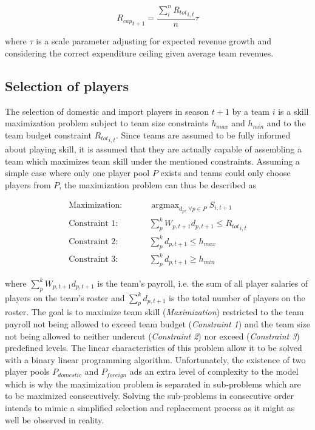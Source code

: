\documentclass[12pt, a4paper]{article}
\DeclareMathOperator*{\argmax}{argmax} %
\begin{document}
\begin{equation} 
{R_{cap}}_{t+1} = \frac{\sum_{i}^{n}{R_{tot}}_{i,t}}{n}\tau
\end{equation}

\noindent
where $\tau$ is a scale parameter adjusting for expected revenue growth and considering the correct expenditure ceiling given average team revenues. 

\subsection{Selection of players}
\label{selectionOfPlayers}
The selection of domestic and import players in season $t+1$ by a team $i$ is a skill maximization problem subject to team size constraints $h_{max}$ and $h_{min}$ and to the team budget constraint ${R_{tot}}_{i,t}$. Since teams are assumed to be fully informed about playing skill, it is assumed that they are actually capable of assembling a team which maximizes team skill under the mentioned constraints. Assuming a simple case where only one player pool $P$ exists and teams could only choose players from $P$, the maximization problem can thus be described as

\begin{equation}
\label{eq:maxProblemTot}
\begin{aligned} 
\textrm{Maximization:} & \hspace{1cm} \argmax_{d_p, \, \forall p \in P} S_{i, t+1} \\
\textrm{Constraint 1:} & \hspace{1cm} \sum_{p}^{k}{W_{p,t+1}d_{p,t+1}}\le{R_{tot}}_{i,t}\\ 
\textrm{Constraint 2:} & \hspace{1cm} \sum_{p}^{k}d_{p, t+1} \leq h_{max}\\ 
\textrm{Constraint 3:} & \hspace{1cm} \sum_{p}^{k}d_{p, t+1} \geq h_{min}
\end{aligned}
\end{equation}

\noindent
where $\sum_{p}^{k}{W_{p,t+1}d_{p,t+1}}$ is the team's payroll, i.e. the sum of all player salaries of players on the team's roster and $\sum_{p}^{k}d_{p, t+1}$ is the total number of players on the roster. The goal is to maximize team skill (\emph{Maximization}) restricted to the team payroll not being allowed to exceed team budget (\emph{Constraint 1}) and the team size not being allowed to neither undercut (\emph{Constraint 2}) nor exceed  (\emph{Constraint 3}) predefined levels. The linear characteristics of this problem allow it to be solved with a binary linear programming algorithm. Unfortunately, the existence of two player pools $P_{domestic}$ and $P_{foreign}$ ads an extra level of complexity to the model which is why the maximization problem is separated in sub-problems which are to be maximized consecutively. Solving the sub-problems in consecutive order intends to mimic a simplified selection and replacement process as it might as well be observed in reality. 
\end{document}
